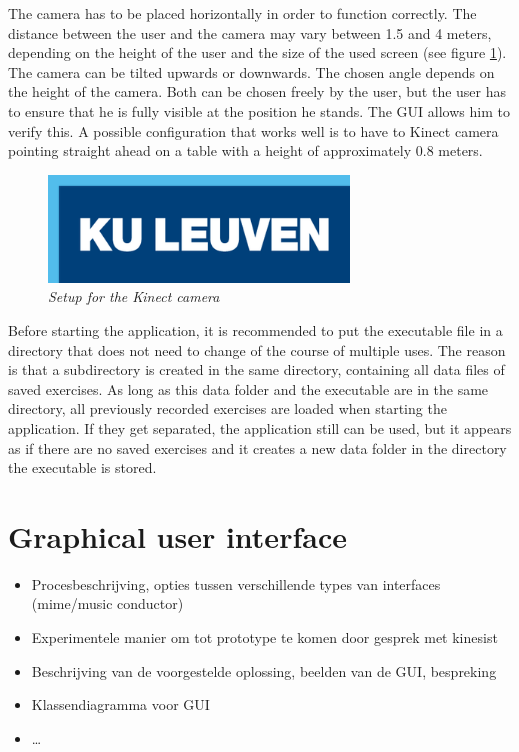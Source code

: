 The camera has to be placed horizontally in order to function correctly. The distance between the user and the camera may vary between 1.5 and 4 meters, depending on the height of the user and the size of the used screen (see figure \ref{fig: kinect_setup}). The camera can be tilted upwards or downwards. The chosen angle depends on the height of the camera. Both can be chosen freely by the user, but the user has to ensure that he is fully visible at the position he stands. The GUI allows him to verify this. A possible configuration that works well is to have to Kinect camera pointing straight ahead on a table with a height of approximately 0.8 meters.\\

\begin{figure}[H]
\begin{center}
\includegraphics[width=8cm]{KUL.png}
\caption{\emph{Setup for the Kinect camera}}
\label{fig: kinect_setup}
\end{center}
\end{figure}

Before starting the application, it is recommended to put the executable file in a directory that does not need to change of the course of multiple uses. The reason is that a subdirectory is created in the same directory, containing all data files of saved exercises. As long as this data folder and the executable are in the same directory, all previously recorded exercises are loaded when starting the application. If they get separated, the application still can be used, but it appears as if there are no saved exercises and it creates a new data folder in the directory the executable is stored.\\


\section{Graphical user interface}

\begin{itemize}
\item Procesbeschrijving, opties tussen verschillende types van interfaces (mime/music conductor)
\item Experimentele manier om tot prototype te komen door gesprek met kinesist
\item Beschrijving van de voorgestelde oplossing, beelden van de GUI, bespreking
\item Klassendiagramma voor GUI
\item \ldots
\end{itemize}

